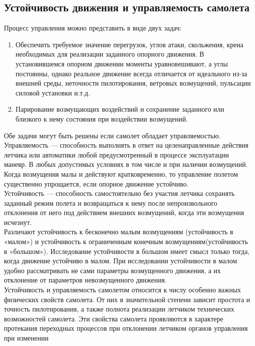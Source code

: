 \documentclass{article}
\begin{document}
\subsection{Устойчивость движения и управляемость самолета}
Процесс управления можно представить в виде двух задач:
\begin{enumerate}
	\item Обеспечить требуемое значение перегрузок, углов атаки, скольжения,
	      крена необходимых для реализации заданного опорного движения. В
	      установившемся опорном движении моменты уравновешивают, а углы
	      постоянны, однако реальное движение всегда отличается от идеального
	      из-за внешней среды, неточности пилотирования, ветровых возмущений,
	      пульсации силовой установки и.т.д.

	\item Парирование возмущающих воздействий и сохранение заданного или
	      близкого к нему состояния при воздействии возмущений.
\end{enumerate}
Обе задачи могут быть решены если самолет обладает управляемостью. \\
Управляемость --- способность выполнять в ответ на целенаправленные действия
летчика или автоматики любой предусмотренный в процессе эксплуатации маневр. В
любых допустимых условиях в том числе и при наличии возмущений. Когда
возмущения малы и действуют кратковременно, то управление полетом существенно
упрощается, если опорное движение устойчиво.\\
Устойчивость --- способность самостоятельно без участия летчика сохранять
заданный режим полета и возвращаться к нему после непроизвольного отклонения от
него под действием внешних возмущений, когда эти возмущения исчезнут.\\
Различают устойчивость к бесконечно малым возмущениям (устойчивость в «малом»)
и устойчивость к ограниченным конечным возмущениям(устойчивость в «большом»).
Исследование устойчивости в большом имеет смысл только тогда, когда движение
устойчиво в малом. При исследовании устойчивости в малом удобно рассматривать
не сами параметры возмущенного движения, а их отклонение от параметров
невозмущенного движения.\\
Устойчивость и управляемость самолетом относится к числу особенно важных
физических свойств самолета. От них в значительной степени зависит простота и
точность пилотирования, а также полнота реализации летчиком технических
возможностей самолета. Эти свойства самолета проявляются в характере протекания
переходных процессов при отклонении летчиком органов управления при изменении
\end{document}

